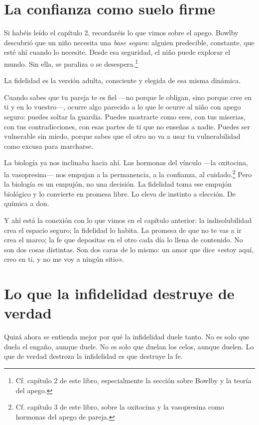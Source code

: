 \section{La confianza como suelo firme}

Si habéis leído el capítulo 2, recordaréis lo que vimos sobre el apego. Bowlby descubrió que un niño necesita una \textit{base segura}: alguien predecible, constante, que esté ahí cuando lo necesite. Desde esa seguridad, el niño puede explorar el mundo. Sin ella, se paraliza o se desespera.\footnote{Cf. capítulo 2 de este libro, especialmente la sección sobre Bowlby y la teoría del apego.}

La fidelidad es la versión adulta, consciente y elegida de esa misma dinámica.

Cuando sabes que tu pareja te es fiel ---no porque le obligan, sino porque cree en ti y en lo vuestro---, ocurre algo parecido a lo que le ocurre al niño con apego seguro: puedes soltar la guardia. Puedes mostrarte como eres, con tus miserias, con tus contradicciones, con esas partes de ti que no enseñas a nadie. Puedes ser vulnerable sin miedo, porque sabes que el otro no va a usar tu vulnerabilidad como excusa para marcharse.

La biología ya nos inclinaba hacia ahí. Las hormonas del vínculo ---la oxitocina, la vasopresina--- nos empujan a la permanencia, a la confianza, al cuidado.\footnote{Cf. capítulo 3 de este libro, sobre la oxitocina y la vasopresina como hormonas del apego de pareja.} Pero la biología es un empujón, no una decisión. La fidelidad toma ese empujón biológico y lo convierte en promesa libre. Lo eleva de instinto a elección. De química a don.

Y ahí está la conexión con lo que vimos en el capítulo anterior: la indisolubilidad crea el espacio seguro; la fidelidad lo habita. La promesa de que no te vas a ir crea el marco; la fe que depositas en el otro cada día lo llena de contenido. No son dos cosas distintas. Son dos caras de lo mismo: un amor que dice «estoy aquí, creo en ti, y no me voy a ningún sitio».

\section{Lo que la infidelidad destruye de verdad}

Quizá ahora se entienda mejor por qué la infidelidad duele tanto. No es solo que duela el engaño, aunque duele. No es solo que duelan los celos, aunque duelen. Lo que de verdad destroza la infidelidad es que destruye la fe.

